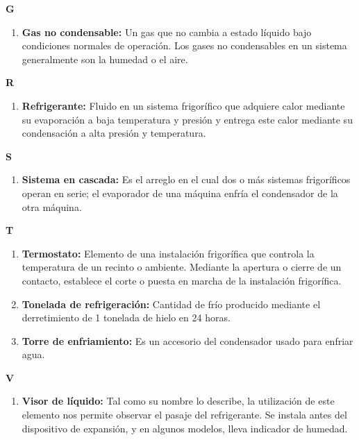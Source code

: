 \textbf{G}
\begin{enumerate}[label={ },leftmargin=*]
	\item \textbf{Gas no condensable:} Un gas que no cambia a estado líquido bajo condiciones normales de operación. Los gases no condensables en un sistema generalmente son la humedad o el aire.
\end{enumerate}

\textbf{R}
\begin{enumerate}[label={ },leftmargin=*]
	\item \textbf{Refrigerante:} Fluido en un sistema frigorífico que adquiere calor mediante su evaporación a baja temperatura y presión y entrega este calor mediante su condensación a alta presión y temperatura.
\end{enumerate}

\textbf{S}
\begin{enumerate}[label={ },leftmargin=*]
	\item \textbf{Sistema en cascada:} Es el arreglo en el cual dos o más sistemas frigoríficos operan en serie; el evaporador de una máquina enfría el condensador de la otra máquina.
\end{enumerate}

\textbf{T}
\begin{enumerate}[label={ },leftmargin=*]
	\item \textbf{Termostato:} Elemento de una instalación frigorífica que controla la temperatura de un recinto o ambiente. Mediante la apertura o cierre de un contacto, establece el corte o puesta en marcha de la instalación frigorífica.
	\item \textbf{Tonelada de refrigeración:} Cantidad de frío producido mediante el derretimiento de 1 tonelada de hielo en 24 horas.
	\item \textbf{Torre de enfriamiento:} Es un accesorio del condensador usado para enfriar agua.
\end{enumerate}

\textbf{V}
\begin{enumerate}[label={},leftmargin=*] %
	\item \textbf{Visor de líquido:} Tal como su nombre lo describe, la utilización de este elemento nos permite observar el pasaje del refrigerante. Se instala antes del dispositivo de expansión, y en algunos modelos, lleva indicador de humedad.
\end{enumerate}
